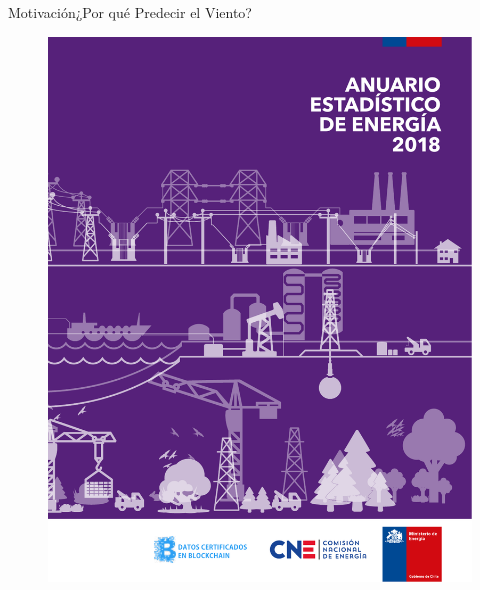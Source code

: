\documentclass[mathserif]{beamer}
\begin{document}
\begin{frame}{Motivación}{¿Por qué Predecir el Viento?}
\begin{figure}
	\centering
	\includegraphics[width=1.0\linewidth,page=30,trim={2cm 18cm 2.5cm 3cm},clip]{fig/01/Anuario-CNE-2018}
	\vspace{3mm}

\end{figure}
\end{frame}
\end{document}
